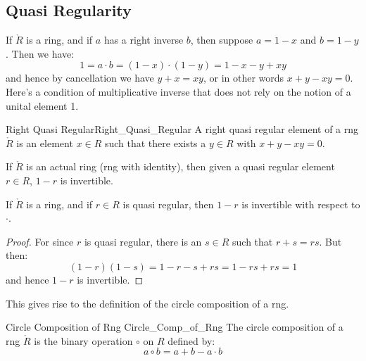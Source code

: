 \documentclass{book}                                                           %
\begin{document}
        \subsection{Quasi Regularity}
            If $\ring{R}$ is a ring, and if $a$ has a right inverse $b$,
            then suppose $a=1-x$ and $b=1-y$. Then we have:
            \begin{equation}
                1=a\cdot{b}=(1-x)\cdot(1-y)=1-x-y+xy
            \end{equation}
            and hence by cancellation we have $y+x=xy$, or in other words
            $x+y-xy=0$. Here's a condition of multiplicative inverse that
            does not rely on the notion of a unital element 1.
            \begin{fdefinition}{Right Quasi Regular}{Right_Quasi_Regular}
                A right quasi regular element of a rng $\ring{R}$ is an
                element $x\in{R}$ such that there exists a $y\in{R}$ with
                $x+y-xy=0$.
            \end{fdefinition}
            If $\ring{R}$ is an actual ring (rng with identity), then given
            a quasi regular element $r\in{R}$, $1-r$ is invertible.
            \begin{theorem}
                If $\ring{R}$ is a ring, and if $r\in{R}$ is quasi regular,
                then $1-r$ is invertible with respect to $\cdot$.
            \end{theorem}
            \begin{proof}
                For since $r$ is quasi regular, there is an $s\in{R}$ such
                that $r+s=rs$. But then:
                \begin{equation}
                    (1-r)(1-s)=1-r-s+rs=1-rs+rs=1
                \end{equation}
                and hence $1-r$ is invertible.
            \end{proof}
            This gives rise to the definition of the circle composition of a
            rng.
            \begin{fdefinition}{Circle Composition of Rng}
                               {Circle_Comp_of_Rng}
                The circle composition of a rng $\ring{R}$ is the binary
                operation $\circ$ on $R$ defined by:
                \begin{equation*}
                    a\circ{b}=a+b-a\cdot{b}
                \end{equation*}
            \end{fdefinition}
\end{document}
